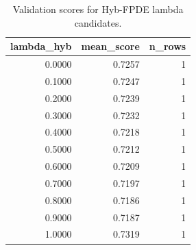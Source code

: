 \begin{table}[t]
\caption{Validation scores for Hyb-FPDE lambda candidates.}
\label{tab:lambda_distribution_computed}
\centering
\begin{tabular}{rrr}
\toprule
lambda\_hyb & mean\_score & n\_rows \\
\midrule
0.0000 & 0.7257 & 1 \\
0.1000 & 0.7247 & 1 \\
0.2000 & 0.7239 & 1 \\
0.3000 & 0.7232 & 1 \\
0.4000 & 0.7218 & 1 \\
0.5000 & 0.7212 & 1 \\
0.6000 & 0.7209 & 1 \\
0.7000 & 0.7197 & 1 \\
0.8000 & 0.7186 & 1 \\
0.9000 & 0.7187 & 1 \\
1.0000 & 0.7319 & 1 \\
\bottomrule
\end{tabular}

\end{table}
